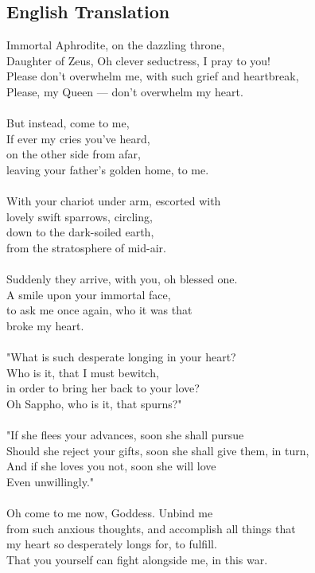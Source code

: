 \begin{multicols}{2}
  \columnbreak
  \subsection*{English Translation}
  \noindent
  Immortal Aphrodite, on the dazzling throne,\\
  \noindent
  Daughter of Zeus, Oh clever seductress, I pray to you!\\
  \noindent
  Please don't overwhelm me, with such grief and heartbreak,\\
  \noindent
  Please, my Queen --- don't overwhelm my heart.\\
  \\
  \noindent
  But instead, come to me,\\
  \noindent
  If ever my cries you've heard,\\
  \noindent
  on the other side from afar,\\
  \noindent
  leaving your father's golden home, to me.\\
  \\
  \noindent
  With your chariot under arm, escorted with\\
  \noindent
  lovely swift sparrows, circling,\\
  \noindent
  down to the dark-soiled earth,\\
  \noindent
  from the stratosphere of mid-air.\\
  \\
  \noindent
  Suddenly they arrive, with you, oh blessed one.\\
  \noindent
  A smile upon your immortal face,\\
  \noindent
  to ask me once again, who it was that\\
  \noindent
  broke my heart.\\
  \\
  \noindent
  "What is such desperate longing in your heart?\\
  \noindent
  Who is it, that I must bewitch,\\
  \noindent
  in order to bring her back to your love?\\
  \noindent
  Oh Sappho, who is it, that spurns?"\\
  \\
  \noindent
  "If she flees your advances, soon she shall pursue\\
  \noindent
  Should she reject your gifts, soon she shall give them, in turn,\\
  \noindent
  And if she loves you not, soon she will love\\
  \noindent
  Even unwillingly."\\
  \\
  \noindent
  Oh come to me now, Goddess. Unbind me\\
  \noindent
  from such anxious thoughts, and accomplish all things that\\
  \noindent
  my heart so desperately longs for, to fulfill.\\
  \noindent
  That you yourself can fight alongside me, in this war.
\end{multicols}

\restoregeometry
